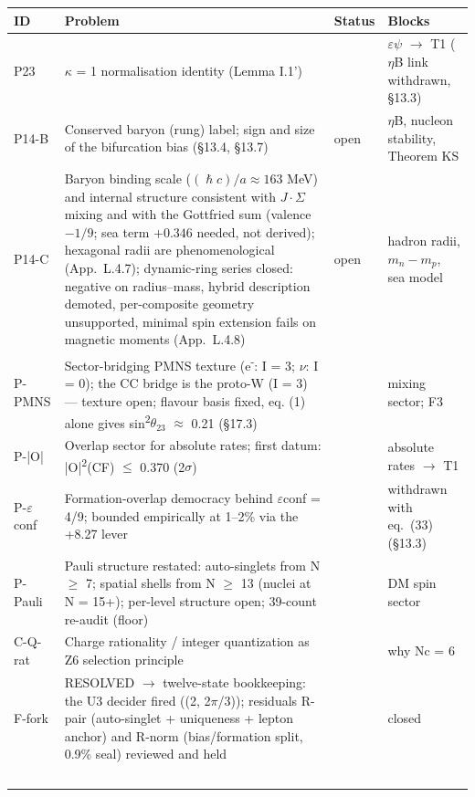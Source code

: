 \documentclass[11pt,letterpaper]{article}
\begin{document}
\begin{footnotesize}\begin{longtable}{|>{\raggedright\arraybackslash}p{}|>{\raggedright\arraybackslash}p{}|>{\raggedright\arraybackslash}p{}|>{\raggedright\arraybackslash}p{}|}
\hline
\textbf{ID} & \textbf{Problem} & \textbf{Status} & \textbf{Blocks} \\ \hline
P23 & $\kappa$ = 1 normalisation identity (Lemma I.1') & [T2+] & $\varepsilon$$\psi$ $\to$ T1 ($\eta$B link withdrawn, §13.3) \\ \hline
P14-B & Conserved baryon (rung) label; sign and size of the bifurcation bias (§13.4, §13.7) & open & $\eta$B, nucleon stability, Theorem KS \\ \hline
P14-C & Baryon binding scale ($(\hslash c)/a\approx163$ MeV) and internal structure consistent with $J\!\cdot\!\Sigma$ mixing and with the Gottfried sum (valence $-1/9$; sea term $+0.346$ needed, not derived); hexagonal radii are phenomenological (App.~L.4.7); dynamic-ring series closed: negative on radius--mass, hybrid description demoted, per-composite geometry unsupported, minimal spin extension fails on magnetic moments (App.~L.4.8) & open & hadron radii, $m_n-m_p$, sea model \\ \hline
P-PMNS & Sector-bridging PMNS texture (e\textsuperscript{-}: I = 3; $\nu$: I = 0); the CC bridge is the proto-W (I = 3) --- texture open; flavour basis fixed, eq. (1) alone gives sin\textsuperscript{2}$\theta_{23}$ $\approx$ 0.21 (§17.3) & [T3] & mixing sector; F3 \\ \hline
P-|O| & Overlap sector for absolute rates; first datum: |O|\textsuperscript{2}(CF) $\le$ 0.370 (2$\sigma$) & [T2] & absolute rates $\to$ T1 \\ \hline
P-$\varepsilon$conf & Formation-overlap democracy behind $\varepsilon$conf = 4/9; bounded empirically at 1--2\% via the +8.27 lever & [T2] & withdrawn with eq.~(33) (§13.3) \\ \hline
P-Pauli & Pauli structure restated: auto-singlets from N $\ge$ 7; spatial shells from N $\ge$ 13 (nuclei at N = 15+); per-level structure open; 39-count re-audit (floor) & [T2] & DM spin sector \\ \hline
C-Q-rat & Charge rationality / integer quantization as Z6 selection principle & [T3] & why Nc = 6 \\ \hline
F-fork & RESOLVED $\to$ twelve-state bookkeeping: the U3 decider fired ((2, 2$\pi$/3)); residuals R-pair (auto-singlet + uniqueness + lepton anchor) and R-norm (bias/formation split, 0.9\% seal) reviewed and held & [T2] & closed \\ \hline
$$
\end{longtable}
\end{footnotesize}
\end{document}
